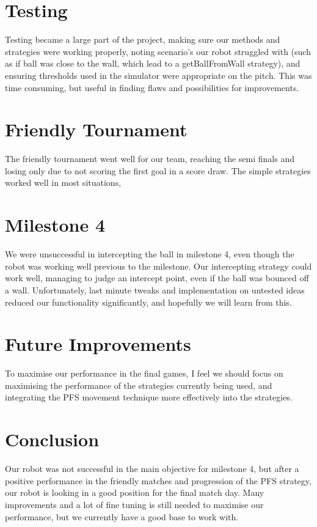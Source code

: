 \documentclass[12pt]{IEEEtran}
\begin{document}
\section{Testing}
Testing became a large part of the project, making sure our methods and strategies were working properly, noting scenario's our robot struggled with (such as if ball was close to the wall, which lead to a getBallFromWall strategy), and ensuring thresholds used in the simulator were appropriate on the pitch. This was time consuming, but useful in finding flaws and possibilities for improvements.

\section{Friendly Tournament}
The friendly tournament went well for our team, reaching the semi finals and losing only due to not scoring the first goal in a score draw. The simple strategies worked well in most situations, 

\section{Milestone 4}
We were unsuccessful in intercepting the ball in milestone 4, even though the robot was working well previous to the milestone. Our intercepting strategy could work well, managing to judge an intercept point, even if the ball was bounced off a wall. Unfortunately, last minute tweaks and implementation on untested ideas reduced our functionality significantly, and hopefully we will learn from this. 

\section{Future Improvements}
To maximise our performance in the final games, I feel we should focus on maximising the performance of the strategies currently being used, and integrating the PFS movement technique more effectively into the strategies. 

\section{Conclusion}
Our robot was not successful in the main objective for milestone 4, but after a positive performance in the friendly matches and progression of the PFS strategy, our robot is looking in a good position for the final match day. Many improvements and a lot of fine tuning is still needed to maximise our performance, but we currently have a good base to work with.
\end{document}

